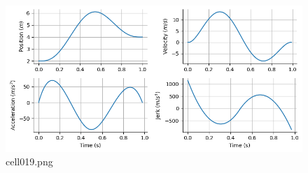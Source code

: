 \begin{figure}[ht]
	\centering
	\includegraphics[scale=0.8, max width=\linewidth]{./fig/motor-learning/minimum-jerk/cell019.png}
	\caption{cell019.png}
	\label{cell019.png}
\end{figure}